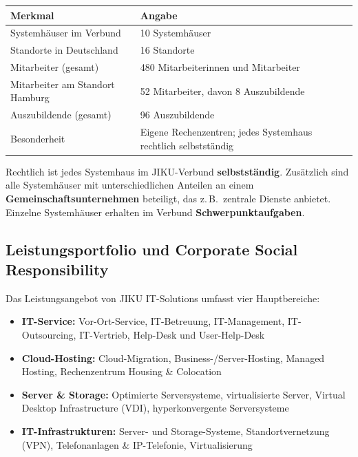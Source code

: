 \documentclass[11pt, a4paper]{article}
\begin{document}
\begin{center}
\begin{tabular}{p{5.5cm} p{7.5cm}}
\toprule
\textbf{Merkmal} & \textbf{Angabe}\\
\midrule
Systemhäuser im Verbund & 10 Systemhäuser\\
Standorte in Deutschland & 16 Standorte\\
Mitarbeiter (gesamt) & 480 Mitarbeiterinnen und Mitarbeiter\\
Mitarbeiter am Standort Hamburg & 52 Mitarbeiter, davon 8 Auszubildende\\
Auszubildende (gesamt) & 96 Auszubildende\\
Besonderheit & Eigene Rechenzentren; jedes Systemhaus rechtlich selbstständig\\
\bottomrule
\end{tabular}
\end{center}

\begin{merksatz}[title={\bfseries Merke: Struktur des JIKU-Verbunds}]
Rechtlich ist jedes Systemhaus im JIKU-Verbund \textbf{selbstständig}. Zusätzlich sind alle
Systemhäuser mit unterschiedlichen Anteilen an einem \textbf{Gemeinschaftsunternehmen} beteiligt,
das z.\,B.\ zentrale Dienste anbietet. Einzelne Systemhäuser erhalten im Verbund
\textbf{Schwerpunktaufgaben}.
\end{merksatz}

\subsection{Leistungsportfolio und Corporate Social Responsibility}

Das Leistungsangebot von JIKU IT-Solutions umfasst vier Hauptbereiche:

\begin{itemize}
  \item \textbf{IT-Service:} Vor-Ort-Service, IT-Betreuung, IT-Management, IT-Outsourcing, IT-Vertrieb, Help-Desk und User-Help-Desk
  \item \textbf{Cloud-Hosting:} Cloud-Migration, Business-/Server-Hosting, Managed Hosting, Rechenzentrum Housing \& Colocation
  \item \textbf{Server \& Storage:} Optimierte Serversysteme, virtualisierte Server, Virtual Desktop Infrastructure (VDI), hyperkonvergente Serversysteme
  \item \textbf{IT-Infrastrukturen:} Server- und Storage-Systeme, Standortvernetzung (VPN), Telefonanlagen \& IP-Telefonie, Virtualisierung
\end{itemize}
\end{document}
